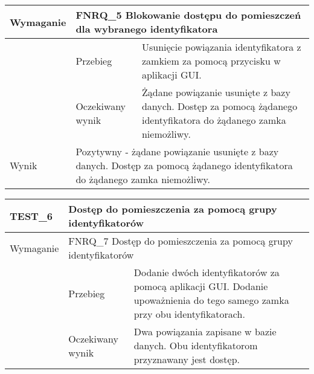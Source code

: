 \begin{table}[h!]
\begin{subtable}[c]{\textwidth}
\begin{tabular}{|p{2cm}|p{}|p{}|}
                    \cellcolor[gray]{0.8} Wymaganie             & \multicolumn{2}{p{12cm}|}{FNRQ\_5 Blokowanie dostępu do pomieszczeń dla wybranego identyfikatora }                                                                                    \\ \hline
                    \cellcolor[gray]{0.8} \multirow{2}{*}{Opis} & Przebieg           & Usunięcie powiązania identyfikatora z zamkiem za pomocą przycisku w aplikacji GUI.  \\ \cline{2-3} 
                    \cellcolor[gray]{0.8}                      & Oczekiwany wynik   & Żądane powiązanie usunięte z bazy danych. Dostęp za pomocą żądanego identyfikatora do żądanego zamka niemożliwy.                                                 \\ \hline
                    \cellcolor[gray]{0.8} Wynik                 & \multicolumn{2}{p{12cm}|}{Pozytywny - żądane powiązanie usunięte z bazy danych. Dostęp za pomocą żądanego identyfikatora do żądanego zamka niemożliwy.}                                                                                  \\ \hline
                    \end{tabular}%
                \label{tbl:test5}
                \vspace{10mm}           
            \end{subtable}
        \quad%
            \begin{subtable}[c]{\textwidth}
                \centering
                    \begin{tabular}{|p{2cm}|p{}|p{}|}
                    \hline
                    TEST\_6               & \multicolumn{2}{p{12cm}|}{\textbf{Dostęp do pomieszczenia za pomocą grupy identyfikatorów}}                                                            \\ \hline
                    \cellcolor[gray]{0.8} Wymaganie             & \multicolumn{2}{p{12cm}|}{FNRQ\_7 Dostęp do pomieszczenia za pomocą grupy identyfikatorów }                                                                                    \\ \hline
                    \cellcolor[gray]{0.8} \multirow{2}{*}{Opis} & Przebieg           & Dodanie dwóch identyfikatorów za pomocą aplikacji GUI. Dodanie upoważnienia do tego samego zamka przy obu identyfikatorach.  \\ \cline{2-3} 
                    \cellcolor[gray]{0.8}                      & Oczekiwany wynik   & Dwa powiązania zapisane w bazie danych. Obu identyfikatorom przyznawany jest dostęp.                                                 \\ \hline

\end{tabular}
\end{subtable}
\end{table}
